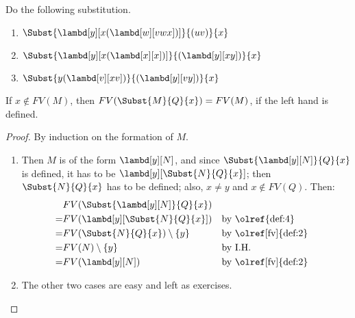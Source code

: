 \documentclass[../../../include/open-logic-section]{subfiles}
\begin{document}
\begin{prob}
  Do the following substitution.
  \begin{enumerate}
  \item $\Subst{\lambd[y][x(\lambd[w][vwx])]}{(uv)}{x}$
  \item $\Subst{\lambd[y][x(\lambd[x][x])]}{(\lambd[y][xy])}{x}$
  \item $\Subst{y(\lambd[v][xv])}{(\lambd[y][vy])}{x}$
  \end{enumerate}
\end{prob}

\begin{thm} 
  If $x \notin FV(M)$, then $FV(\Subst{M}{Q}{x}) = FV(M)$, if
  the left hand is defined.
\end{thm}
\begin{proof}
  By induction on the formation of $M$.
  \begin{enumerate}
    \item[\rule{ABS}] Then $M$ is of the form $\lambd[y][N]$, and
      since $\Subst{\lambd[y][N]}{Q}{x}$ is defined, it has to be
      $\lambd[y][\Subst{N}{Q}{x}]$; then $\Subst{N}{Q}{x}$ has
      to be defined; also, $x \neq y$ and $x \notin FV(Q)$. Then:
      \begin{align*}
        &FV(\Subst{\lambd[y][N]}{Q}{x}) \\
        =&FV(\lambd[y][\Subst{N}{Q}{x}]) && \text{by \olref{def:4}}\\
        =&FV(\Subst{N}{Q}{x}) \setminus \{y\} && \text{by
                                                     \olref[fv]{def:2}}
        \\
        =&FV(N) \setminus \{y\} && \text{by I.H.} \\
        =&FV(\lambd[y][N]) && \text{by \olref[fv]{def:2}}
      \end{align*}
    \item The other two cases are easy and left as exercises.
  \end{enumerate}
\end{proof}
\end{document}
